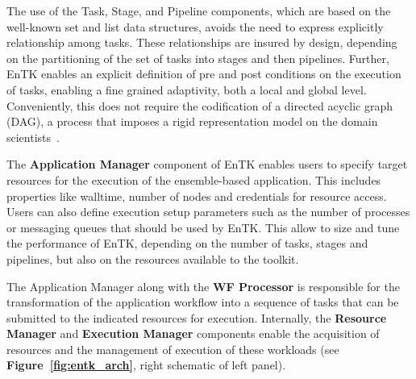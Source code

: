 
The use of the Task, Stage, and Pipeline components, which are based on the well-known set
and list data structures, avoids the need to express explicitly relationship
among tasks. These relationships are insured by design, depending on the
partitioning of the set of tasks into stages and then pipelines. Further,
EnTK enables an explicit definition of pre and post conditions on the
execution of tasks, enabling a fine grained adaptivity, both a local and global 
level. Conveniently, this does not require the codification of a directed acyclic 
graph (DAG), a process that imposes a rigid representation model on the domain scientists~\cite{balasubramanian2017powerofmany}.

The \textbf{Application Manager} component of EnTK enables users to specify
target resources for the execution of the ensemble-based application. This
includes properties like walltime, number of nodes and credentials for
resource access. Users can also define execution setup parameters such as
the number of processes or messaging queues that should be used by EnTK\@.
This allow to size and tune the performance of EnTK, depending on the
number of tasks, stages and pipelines, but also on the resources available
to the toolkit.

The Application Manager along with the \textbf{WF Processor} is responsible
for the transformation of the application workflow into a sequence of tasks
that can be submitted to the indicated resources for execution. Internally,
the \textbf{Resource Manager} and \textbf{Execution Manager} components
enable the acquisition of resources and the management of execution of
these workloads (see \textbf{Figure~\ref{fig:entk_arch}}, right schematic
of left panel).



